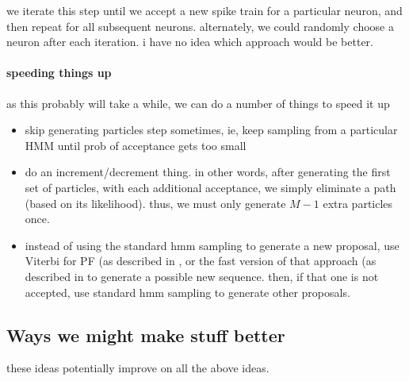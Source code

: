 \documentclass[12pt]{article}
\begin{document}
we iterate this step until we accept a new spike train for a particular neuron, and then repeat for all subsequent neurons. alternately, we could randomly choose a neuron after each iteration.  i have no idea which approach would be better.

\paragraph{speeding things up}

as this probably will take a while, we can do a number of things to speed it up

\begin{itemize}
\item skip generating particles step sometimes, ie, keep sampling from a particular HMM until prob of acceptance gets too small
\item do an increment/decrement thing.  in other words, after generating the first set of particles, with each additional acceptance, we simply eliminate a path (based on its likelihood).  thus, we must only generate $M-1$ extra particles once.
\item instead of using the standard hmm sampling to generate a new proposal, use Viterbi for PF (as described in \cite{GodsillWest01}, or the fast version of that approach (as described in \cite{KlaasFreitas05} to generate a possible new sequence. then, if that one is not accepted, use standard hmm sampling to generate other proposals.
\end{itemize}

\subsection{Ways we might make stuff better}

these ideas potentially improve on all the above ideas.
\end{document}
